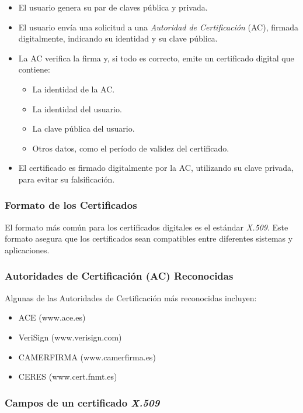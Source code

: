 \documentclass[a4paper,12pt]{article}
\begin{document}
\begin{itemize}
    \item El usuario genera su par de claves pública y privada.
    \item El usuario envía una solicitud a una \textit{Autoridad de Certificación} (AC), firmada digitalmente, indicando su identidad y su clave pública.
    \item La AC verifica la firma y, si todo es correcto, emite un certificado digital que contiene:
    \begin{itemize}
        \item La identidad de la AC.
        \item La identidad del usuario.
        \item La clave pública del usuario.
        \item Otros datos, como el período de validez del certificado.
    \end{itemize}
    \item El certificado es firmado digitalmente por la AC, utilizando su clave privada, para evitar su falsificación.
\end{itemize}

\subsubsection{Formato de los Certificados}

El formato más común para los certificados digitales es el estándar \textit{X.509}. Este formato asegura que los certificados sean compatibles entre diferentes sistemas y aplicaciones.

\subsubsection{Autoridades de Certificación (AC) Reconocidas}

Algunas de las Autoridades de Certificación más reconocidas incluyen:

\begin{itemize}
    \item ACE (www.ace.es)
    \item VeriSign (www.verisign.com)
    \item CAMERFIRMA (www.camerfirma.es)
    \item CERES (www.cert.fnmt.es)
\end{itemize}

\subsubsection{Campos de un certificado \textit{X.509}}
\end{document}
